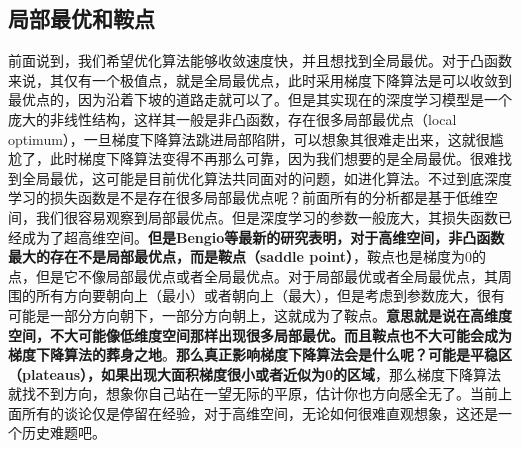 \documentclass[12pt]{article}
\begin{document}
\subsection{局部最优和鞍点}
前面说到，我们希望优化算法能够收敛速度快，并且想找到全局最优。对于凸函数来说，其仅有一个极值点，就是全局最优点，此时采用梯度下降算法是可以收敛到最优点的，因为沿着下坡的道路走就可以了。但是其实现在的深度学习模型是一个庞大的非线性结构，这样其一般是非凸函数，存在很多局部最优点（local optimum），一旦梯度下降算法跳进局部陷阱，可以想象其很难走出来，这就很尴尬了，此时梯度下降算法变得不再那么可靠，因为我们想要的是全局最优。很难找到全局最优，这可能是目前优化算法共同面对的问题，如进化算法。不过到底深度学习的损失函数是不是存在很多局部最优点呢？前面所有的分析都是基于低维空间，我们很容易观察到局部最优点。但是深度学习的参数一般庞大，其损失函数已经成为了超高维空间。\textbf{但是Bengio等最新的研究表明，对于高维空间，非凸函数最大的存在不是局部最优点，而是鞍点（saddle point）}，鞍点也是梯度为0的点，但是它不像局部最优点或者全局最优点。对于局部最优或者全局最优点，其周围的所有方向要朝向上（最小）或者朝向上（最大），但是考虑到参数庞大，很有可能是一部分方向朝下，一部分方向朝上，这就成为了鞍点。\textbf{意思就是说在高维度空间，不大可能像低维度空间那样出现很多局部最优。而且鞍点也不大可能会成为梯度下降算法的葬身之地}。\textbf{那么真正影响梯度下降算法会是什么呢？可能是平稳区（plateaus），如果出现大面积梯度很小或者近似为0的区域}，那么梯度下降算法就找不到方向，想象你自己站在一望无际的平原，估计你也方向感全无了。当前上面所有的谈论仅是停留在经验，对于高维空间，无论如何很难直观想象，这还是一个历史难题吧。



\end{document}
